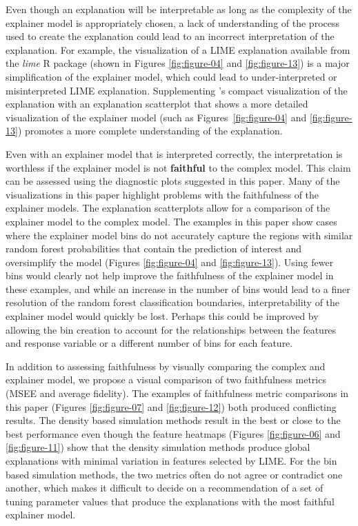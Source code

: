 \documentclass[AMS,STIX2COL]{WileyNJD-v2}\usepackage[]{graphicx}\usepackage[]{color}
\begin{document}
Even though an explanation will be interpretable as long as the complexity of the explainer model is appropriately chosen, a lack of understanding of the process used to create the explanation could lead to an incorrect interpretation of the explanation. For example, the visualization of a LIME explanation available from the \emph{lime} R package \citep{pedersen:2020} (shown in Figures \ref{fig:figure-04} and \ref{fig:figure-13}) is a major simplification of the explainer model, which could lead to under-interpreted or misinterpreted LIME explanation. Supplementing \citet{pedersen:2020}'s compact visualization of the explanation with an explanation scatterplot that shows a more detailed visualization of the explainer model (such as Figures~\ref{fig:figure-04} and \ref{fig:figure-13}) promotes a more complete understanding of the explanation.

Even with an explainer model that is interpreted correctly, the interpretation is worthless if the explainer model is not \textbf{faithful} to the complex model. This claim can be assessed using the diagnostic plots suggested in this paper. Many of the visualizations in this paper highlight problems with the faithfulness of the explainer models. The explanation scatterplots allow for a comparison of the explainer model to the complex model. The examples in this paper show cases where the explainer model bins do not accurately capture the regions with similar random forest probabilities that contain the prediction of interest and oversimplify the model (Figures \ref{fig:figure-04} and \ref{fig:figure-13}). Using fewer bins would clearly not help improve the faithfulness of the explainer model in these examples, and while an increase in the number of bins would lead to a finer resolution of the random forest classification boundaries, interpretability of the explainer model would quickly be lost. Perhaps this could be improved by allowing the bin creation to account for the relationships between the features and response variable or a different number of bins for each feature.

In addition to assessing faithfulness by visually comparing the complex and explainer model, we propose a visual comparison of two faithfulness metrics (MSEE and average fidelity). The examples of faithfulness metric comparisons in this paper (Figures \ref{fig:figure-07} and \ref{fig:figure-12}) both produced conflicting results. The density based simulation methods result in the best or close to the best performance even though the feature heatmaps (Figures \ref{fig:figure-06} and \ref{fig:figure-11}) show that the density simulation methods produce global explanations with minimal variation in features selected by LIME. For the bin based simulation methods, the two metrics often do not agree or contradict one another, which makes it difficult to decide on a recommendation of a set of tuning parameter values that produce the explanations with the most faithful explainer model.
\end{document}
